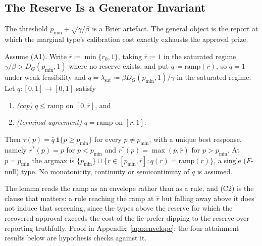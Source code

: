 \documentclass[acmsmall,nonacm,screen]{acmart}
\theoremstyle{acmplain}%
\theoremstyle{acmdefinition}%
\numberwithin{equation}{section}
\begin{document}
\subsection{The Reserve Is a Generator Invariant}

The threshold $p_{\min} + \sqrt{\gamma/\beta}$ is a Brier artefact. The general object is the report at which the marginal type's calibration cost exactly exhausts the approval prize.

\begin{lemma}\label{lem:envelope}
Assume (A1). Write $\bar r \coloneqq \min\{r_0,1\}$, taking $\bar r \coloneqq 1$ in the saturated regime $\gamma/\beta > D_G(p_{\min},1)$ where no reserve exists, and put $\bar q \coloneqq \mathrm{ramp}(\bar r)$, so $\bar q = 1$ under weak feasibility and $\bar q = \lambda_{\mathrm{sat}} \coloneqq \beta D_G(p_{\min},1)/\gamma$ in the saturated regime. Let $q : [0,1] \to [0,1]$ satisfy
\begin{enumerate}
\item[(C1)] \emph{(cap)} $q \le \mathrm{ramp}$ on $[0,\bar r]$, and
\item[(C2)] \emph{(terminal agreement)} $q = \mathrm{ramp}$ on $[\bar r,1]$.
\end{enumerate}
Then $\tau(p) = \bar q\,\mathbf 1\{p \ge p_{\min}\}$ for every $p \ne p_{\min}$, with a unique best response, namely $r^*(p) = p$ for $p < p_{\min}$ and $r^*(p) = \max(p,\bar r)$ for $p > p_{\min}$. At $p = p_{\min}$ the argmax is $\{p_{\min}\} \cup \{r \in [p_{\min},\bar r] : q(r) = \mathrm{ramp}(r)\}$, a single ($F$-null) type. No monotonicity, continuity or semicontinuity of $q$ is assumed.
\end{lemma}

The lemma reads the ramp as an envelope rather than as a rule, and (C2) is the clause that matters: a rule reaching the ramp at $\bar r$ but falling away above it does not induce that screening, since the types above the reserve for which the recovered approval exceeds the cost of the lie prefer dipping to the reserve over reporting truthfully. Proof in Appendix~\ref{app:envelope}; the four attainment results below are hypothesis checks against it.
\end{document}
